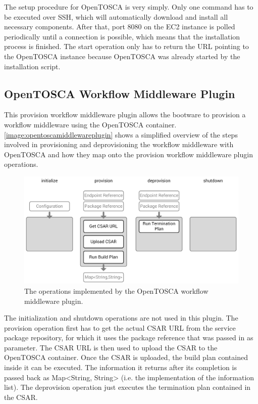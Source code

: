The setup procedure for OpenTOSCA is very simply.
Only one command has to be executed over SSH, which will automatically download and install all necessary components.
After that, port 8080 on the EC2 instance is polled periodically until a connection is possible, which means that the installation process is finished.
The start operation only has to return the URL pointing to the OpenTOSCA instance because OpenTOSCA was already started by the installation script.

\subsection{OpenTOSCA Workflow Middleware Plugin}

This provision workflow middleware plugin allows the bootware to provision a workflow middleware using the OpenTOSCA container.
\autoref{image:opentoscamiddlewareplugin} shows a simplified overview of the steps involved in provisioning and deprovisioning the workflow middleware with OpenTOSCA and how they map onto the provision workflow middleware plugin operations.

\begin{figure}[!htbp]
	\centering
	\includegraphics[resolution=600]{implementation/assets/opentosca_middleware_plugin}
	\caption{The operations implemented by the OpenTOSCA workflow middleware plugin.}
	\label{image:opentoscamiddlewareplugin}
\end{figure}

The initialization and shutdown operations are not used in this plugin.
The provision operation first has to get the actual CSAR URL from the service package repository, for which it uses the package reference that was passed in as parameter.
The CSAR URL is then used to upload the CSAR to the OpenTOSCA container.
Once the CSAR is uploaded, the build plan contained inside it can be executed.
The information it returns after its completion is passed back as Map<String, String> (i.e. the implementation of the information list).
The deprovision operation just executes the termination plan contained in the CSAR.

